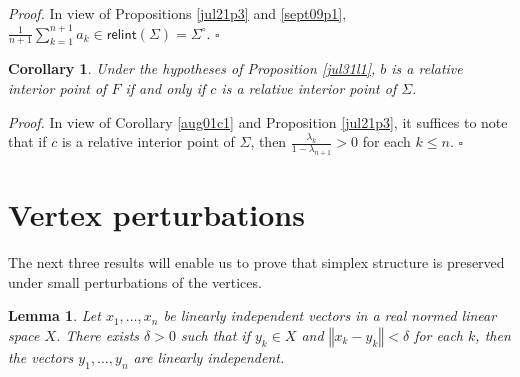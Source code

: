 \documentclass[11pt]{article}%
\newtheorem{corollary}[theorem]{Corollary}
\newtheorem{lemma}[theorem]{Lemma}
\newenvironment{proof}[1][Proof]{\noindent\textit{#1.} }{}
\begin{document}
\begin{proof}
In view of Propositions \ref{jul21p3} and \ref{sept09p1}, $\frac{1}{n+1}%
\sum_{k=1}^{n+1}a_{k}\in\mathsf{relint}(\Sigma)=\Sigma^{\circ}$.%
\hfill
$\square$
\end{proof}

\begin{corollary}
\label{sept10c1}Under the hypotheses of \emph{Proposition \ref{jul31l1}, }$b$
is a relative interior point of $F$ if and only if $c$ is a relative interior
point of $\Sigma$.
\end{corollary}

\begin{proof}
In view of Corollary \ref{aug01c1} and Proposition \ref{jul21p3}, it suffices
to note that if $c$ is a relative interior point of $\Sigma$, then
$\frac{\lambda_{k}}{1-\lambda_{n+1}}>0$ for each $k\leq n$.%
\hfill
$\square$
\end{proof}

\section{Vertex perturbations}

The next three results will enable us to prove that simplex structure is
preserved under small perturbations of the vertices.

\begin{lemma}
\label{apr28l2}Let $x_{1},\ldots,x_{n}$ be linearly independent vectors in a
real normed linear space $X$. There exists $\delta>0$ such that if $y_{k}\in
X$ and $\left\Vert x_{k}-y_{k}\right\Vert <\delta$ for each $k$, then the
vectors $y_{1},\ldots,y_{n}$ are linearly independent.
\end{lemma}
\end{document}
